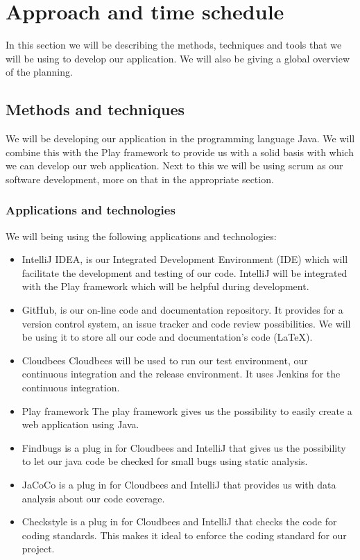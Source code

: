 \documentclass[]{article}
\begin{document}
\section{Approach and time schedule}
In this section we will be describing the methods, techniques and tools that we will be using to develop our application.
We will also be giving a global overview of the planning.

\subsection{Methods and techniques}
We will be developing our application in the programming language Java.
We will combine this with the Play framework to provide us with a solid basis with which we can develop our web application.
Next to this we will be using scrum as our software development, more on that in the appropriate section.

\subsubsection{Applications and technologies}
We will being using the following applications and technologies:
\begin{itemize}
\item IntelliJ IDEA, is our Integrated Development Environment (IDE) which will facilitate the development and testing of our code.
IntelliJ will be integrated with the Play framework which will be helpful during development.
\item GitHub, is our on-line code and documentation repository.
It provides for a version control system, an issue tracker and code review possibilities.
We will be using it to store all our code and documentation's code (LaTeX).
\item Cloudbees
Cloudbees will be used to run our test environment, our continuous integration and the release environment.
It uses Jenkins for the continuous integration.
\item Play framework
The play framework gives us the possibility to easily create a web application using Java.
\item Findbugs is a plug in for Cloudbees and IntelliJ that gives us the possibility to let our java code be checked for small bugs using static analysis.
\item JaCoCo is a plug in for Cloudbees and IntelliJ that provides us with data analysis about our code coverage.
\item Checkstyle is a plug in for Cloudbees and IntelliJ that checks the code for coding standards.
This makes it ideal to enforce the coding standard for our project.
\end{itemize}
\end{document}
